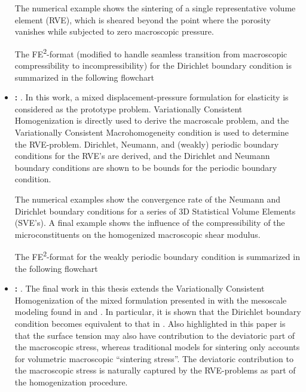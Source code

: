 \documentclass[MikaelDissertation.tex]{subfiles}
\begin{document}
\begin{itemize}
The numerical example shows the sintering of a single representative volume element (RVE), which is sheared beyond the point where the porosity vanishes while subjected to zero macroscopic pressure.

The FE\textsuperscript{2}-format (modified to handle seamless transition from macroscopic compressibility to incompressibility) for the Dirichlet boundary condition is summarized in the following flowchart
\begin{center}
  
\end{center}


 \item \textbf{: }.
In this work, a mixed displacement-pressure formulation for elasticity is considered as the prototype problem.
Variationally Consistent Homogenization is directly used to derive the macroscale problem, and the Variationally Consistent Macrohomogeneity condition is used to determine the RVE-problem.
Dirichlet, Neumann, and (weakly) periodic boundary conditions for the RVE's are derived, and the Dirichlet and Neumann boundary conditions are shown to be bounds for the periodic boundary condition.

The numerical examples show the convergence rate of the Neumann and Dirichlet boundary conditions for a series of 3D Statistical Volume Elements (SVE's).
A final example shows the influence of the compressibility of the microconstituents on the homogenized macroscopic shear modulus.


The FE\textsuperscript{2}-format for the weakly periodic boundary condition is summarized in the following flowchart
\begin{center}
  
\end{center}


 \item \textbf{: }.
The final work in this thesis extends the Variationally Consistent Homogenization of the mixed formulation presented in  with the mesoscale modeling found in  and .
In particular, it is shown that the Dirichlet boundary condition becomes equivalent to that in .
Also highlighted in this paper is that the surface tension may also have contribution to the deviatoric part of the macroscopic stress, whereas traditional models for sintering only accounts for volumetric macroscopic ``sintering stress''.
The deviatoric contribution to the macroscopic stress is naturally captured by the RVE-problems as part of the homogenization procedure.


\end{itemize}
\end{document}
